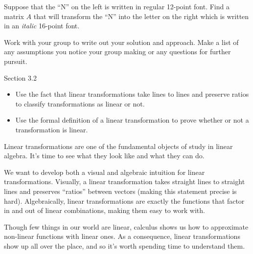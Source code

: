 \documentclass{problemset}
\begin{document}
\begin{iola}
Suppose that the ``N'' on the left is written in regular 12-point font.  Find a matrix $A$ that will transform
	the ``N'' into the letter on the right which is written in an \emph{italic} 16-point font.

Work with your group to write out your solution and approach.  Make a list of any assumptions you
notice your group making or any questions for further pursuit.
\end{iola}


\begin{lesson}

	Section 3.2

	\begin{itemize}
		\item Use the fact that linear transformations take lines to lines and preserve
			ratios to classify transformations as linear or not.
		\item Use the formal definition of a linear transformation to prove whether or not a
			transformation is linear.
	\end{itemize}

		Linear transformations are one of the fundamental objects of study in linear algebra.
		It's time to see what they look like and what they can do.

		We want to develop both a visual and algebraic intuition for linear transformations.
		Visually, a linear transformation takes straight lines to straight lines and preserves ``ratios'' between
		vectors (making this statement precise is hard). Algebraically, linear transformations are exactly
		the functions that factor in and out of linear combinations, making them easy to work with.

		Though few things in our world are linear, calculus shows us how to approximate
		non-linear functions with linear ones. As a consequence, linear transformations show
		up all over the place, and so it's worth spending time to understand them.
\end{lesson}
\end{document}
